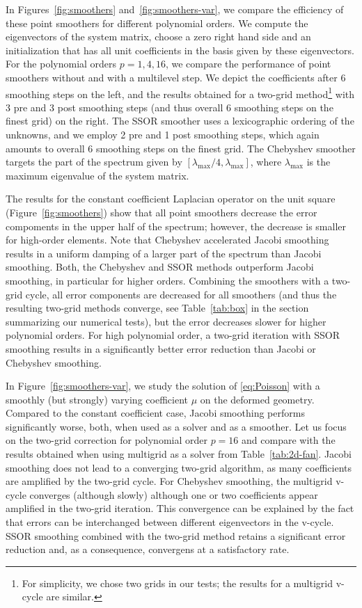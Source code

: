 \documentclass[smallcondensed,final]{svjour3}     %
\begin{document}
In Figures~\ref{fig:smoothers} and~\ref{fig:smoothers-var}, we compare
the efficiency of these point smoothers for different polynomial
orders. We compute the eigenvectors of the system matrix, choose a
zero right hand side and an initialization that has all unit
coefficients in the basis given by these eigenvectors. For the
polynomial orders $p=1,4,16$, we compare the performance of point
smoothers without and with a multilevel step.  We depict the
coefficients after 6 smoothing steps on the left, and the results
obtained for a two-grid method\footnote{For simplicity, we chose two
  grids in our tests; the results for a multigrid v-cycle are
  similar.} with 3 pre and 3 post smoothing steps (and thus overall 6
smoothing steps on the finest grid) on the right. The SSOR smoother
uses a lexicographic ordering of the unknowns, and we employ 2 pre and 1
post smoothing steps, which again amounts to overall 6 smoothing steps
on the finest grid. The Chebyshev smoother targets the part of the
spectrum given by $[\lambda_\text{max}/4,\lambda_\text{max}]$, where
$\lambda_\text{max}$ is the maximum eigenvalue of the system matrix.

The results for the constant coefficient Laplacian operator on the
unit square (Figure~\ref{fig:smoothers}) show that all point
smoothers decrease the error compoments in the upper half of the
spectrum; however,  the decrease is smaller for high-order
elements. Note that Chebyshev accelerated Jacobi smoothing results in
a uniform damping of a larger part of the spectrum than Jacobi
smoothing.  Both, the Chebyshev and SSOR methods outperform Jacobi
smoothing, in particular for higher orders. Combining the smoothers
with a two-grid cycle, all error components are decreased for all
smoothers (and thus the resulting two-grid methods converge, see
Table~\ref{tab:box} in the section summarizing our numerical tests),
but the error decreases slower for higher polynomial orders. For high
polynomial order, a two-grid iteration with SSOR smoothing results in a
significantly better error reduction than Jacobi or Chebyshev
smoothing.

In Figure~\ref{fig:smoothers-var}, we study the solution of
\eqref{eq:Poisson} with a smoothly (but strongly) varying coefficient
$\mu$ on the deformed geometry. Compared to the constant coefficient
case, Jacobi smoothing performs significantly worse, both, when used
as a solver and as a smoother. Let us focus on the two-grid correction
for polynomial order $p=16$ and compare with the results obtained when
using multigrid as a solver from Table~\ref{tab:2d-fan}.  Jacobi
smoothing does not lead to a converging two-grid algorithm, as many
coefficients are amplified by the two-grid cycle. For Chebyshev
smoothing, the multigrid v-cycle converges (although slowly) although
one or two coefficients appear amplified in the two-grid
iteration. This convergence can be explained by the fact that errors
can be interchanged between different eigenvectors in the v-cycle.
SSOR smoothing combined with the two-grid method retains a significant
error reduction and, as a consequence, convergens at a satisfactory
rate.
\end{document}
